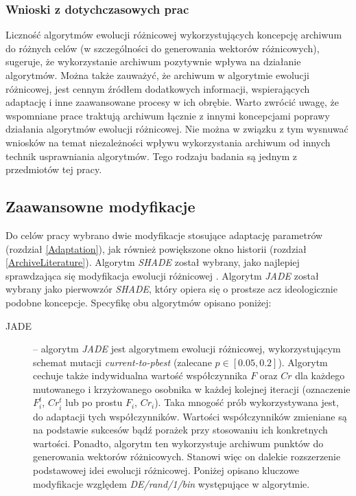 \documentclass[12pt,a4paper]{report}
\begin{document}
{{{\subsubsection{Wnioski z dotychczasowych prac}
\par{
Liczność algorytmów ewolucji różnicowej wykorzystujących koncepcję archiwum do różnych celów (w szczególności do generowania wektorów różnicowych), sugeruje, że wykorzystanie archiwum pozytywnie wpływa na działanie algorytmów. Można także zauważyć, że archiwum w algorytmie ewolucji różnicowej, jest cennym źródłem dodatkowych informacji, wspierających adaptację i inne zaawansowane procesy w ich obrębie. Warto zwrócić uwagę, że wspomniane prace traktują archiwum łącznie z innymi koncepcjami poprawy działania algorytmów ewolucji różnicowej. Nie można w związku z tym wysnuwać wniosków na temat niezależności wpływu wykorzystania archiwum od innych technik usprawniania algorytmów. Tego rodzaju badania są jednym z przedmiotów tej pracy.
}

\subsection{Zaawansowne modyfikacje}
\label{AdvancedDE}
\par{
Do celów pracy wybrano dwie modyfikacje stosujące adaptację parametrów (rozdział \ref{Adaptation}), jak również powiększone okno historii (rozdział \ref{ArchiveLiterature}). Algorytm \emph{SHADE} \cite{SHADE} został wybrany, jako najlepiej sprawdzająca się modyfikacja ewolucji różnicowej \cite{CEC2013Comp}. Algorytm \emph{JADE} \cite{JADE} został wybrany jako pierwowzór \emph{SHADE}, który opiera się o prostsze acz ideologicznie podobne koncepcje. Specyfikę obu algorytmów opisano poniżej:
}
\begin{description}
\item[JADE] \cite{JADE} -- algorytm \emph{JADE} jest algorytmem ewolucji różnicowej, wykorzystującym schemat mutacji \emph{current-to-pbest} (zalecane $p \in [0.05, 0.2]$). Algorytm cechuje także indywidualna wartość współczynnika $F$ oraz $Cr$ dla każdego mutowanego i krzyżowanego osobnika w każdej kolejnej iteracji (oznaczenie $F_i^t$, $Cr_i^t$ lub po prostu $F_i$, $Cr_i$). Taka mnogość prób wykorzystywana jest, do adaptacji tych współczynników. Wartości współczynników zmieniane są na podstawie sukcesów bądź porażek przy stosowaniu ich konkretnych wartości. Ponadto, algorytm ten wykorzystuje archiwum punktów do generowania wektorów różnicowych. Stanowi więc on dalekie rozszerzenie podstawowej idei ewolucji różnicowej. Poniżej opisano kluczowe modyfikacje względem \emph{DE/rand/1/bin} występujące w algorytmie.

\end{description}}}}
\end{document}
